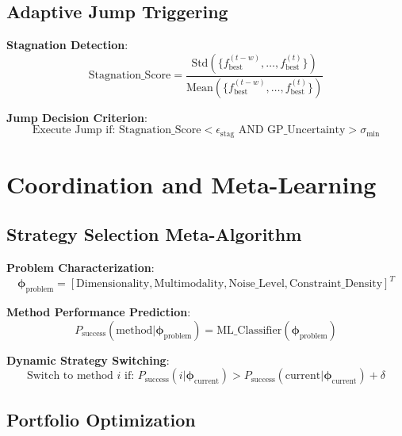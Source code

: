 \documentclass[11pt,a4paper]{article}
\begin{document}
\subsection{Adaptive Jump Triggering}

\textbf{Stagnation Detection}:
\begin{equation}
\text{Stagnation\_Score} = \frac{\text{Std}(\{f_{\text{best}}^{(t-w)}, \ldots, f_{\text{best}}^{(t)}\})}{\text{Mean}(\{f_{\text{best}}^{(t-w)}, \ldots, f_{\text{best}}^{(t)}\})}
\end{equation}

\textbf{Jump Decision Criterion}:
\begin{equation}
\text{Execute Jump if: } \text{Stagnation\_Score} < \epsilon_{\text{stag}} \text{ AND } \text{GP\_Uncertainty} > \sigma_{\text{min}}
\end{equation}

\section{Coordination and Meta-Learning}

\subsection{Strategy Selection Meta-Algorithm}

\textbf{Problem Characterization}:
\begin{equation}
\boldsymbol{\phi}_{\text{problem}} = [\text{Dimensionality}, \text{Multimodality}, \text{Noise\_Level}, \text{Constraint\_Density}]^T
\end{equation}

\textbf{Method Performance Prediction}:
\begin{equation}
P_{\text{success}}(\text{method} | \boldsymbol{\phi}_{\text{problem}}) = \text{ML\_Classifier}(\boldsymbol{\phi}_{\text{problem}})
\end{equation}

\textbf{Dynamic Strategy Switching}:
\begin{equation}
\text{Switch to method } i \text{ if: } P_{\text{success}}(i | \boldsymbol{\phi}_{\text{current}}) > P_{\text{success}}(\text{current} | \boldsymbol{\phi}_{\text{current}}) + \delta
\end{equation}

\subsection{Portfolio Optimization}
\end{document}
